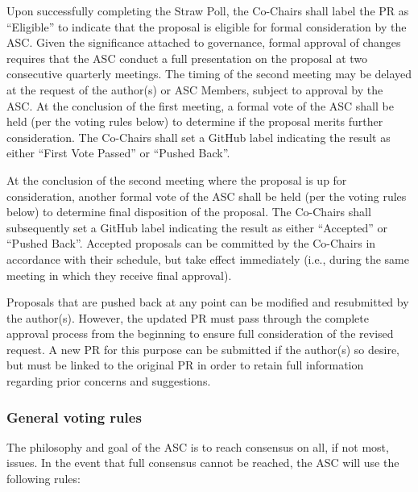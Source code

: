 \documentclass{article}
\begin{document}
Upon successfully completing the Straw Poll, the Co-Chairs shall label
the PR as ``Eligible'' to indicate that the proposal is
eligible for formal consideration by the ASC. Given the significance
attached to governance, formal approval of changes requires that the ASC
conduct a full presentation on the proposal at two consecutive quarterly
meetings. The timing of the second meeting may be delayed at the request
of the author(s) or ASC Members, subject to approval by the ASC. At the
conclusion of the first meeting, a formal vote of the ASC shall be held
(per the voting rules below) to determine if the proposal merits further
consideration. The Co-Chairs shall set a GitHub label indicating the
result as either ``First Vote Passed'' or ``Pushed
Back''.

At the conclusion of the second meeting where the proposal is up for
consideration, another formal vote of the ASC shall be held (per the
voting rules below) to determine final disposition of the proposal. The
Co-Chairs shall subsequently set a GitHub label indicating the result as
either ``Accepted'' or ``Pushed Back''. Accepted
proposals can be committed by the Co-Chairs in accordance with their
schedule, but take effect immediately (i.e., during the same meeting in
which they receive final approval).

Proposals that are pushed back at any point can be modified and
resubmitted by the author(s). However, the updated PR must pass through
the complete approval process from the beginning to ensure full
consideration of the revised request. A new PR for this purpose can be
submitted if the author(s) so desire, but must be linked to the original
PR in order to retain full information regarding prior concerns and
suggestions.

\hypertarget{general-voting-rules}{%
\subsubsection{General voting rules}\label{general-voting-rules}}

The philosophy and goal of the ASC is to reach consensus on all, if not
most, issues. In the event that full consensus cannot be reached, the
ASC will use the following rules:
\end{document}
